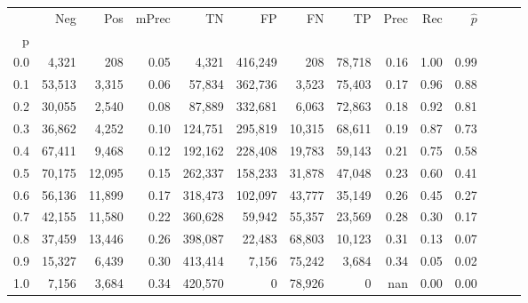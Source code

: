 \begin{tabular}{rrrrrrrrrrrrrr}
\toprule
{} &     Neg &     Pos & mPrec &       TN &       FP &      FN &      TP &  Prec &   Rec & $\hat{p}$ \\
p   &         &         &       &          &          &         &         &       &       &           \\
\midrule
0.0 &   4,321 &     208 &  0.05 &    4,321 &  416,249 &     208 &  78,718 &  0.16 &  1.00 &      0.99 \\
0.1 &  53,513 &   3,315 &  0.06 &   57,834 &  362,736 &   3,523 &  75,403 &  0.17 &  0.96 &      0.88 \\
0.2 &  30,055 &   2,540 &  0.08 &   87,889 &  332,681 &   6,063 &  72,863 &  0.18 &  0.92 &      0.81 \\
0.3 &  36,862 &   4,252 &  0.10 &  124,751 &  295,819 &  10,315 &  68,611 &  0.19 &  0.87 &      0.73 \\
0.4 &  67,411 &   9,468 &  0.12 &  192,162 &  228,408 &  19,783 &  59,143 &  0.21 &  0.75 &      0.58 \\
0.5 &  70,175 &  12,095 &  0.15 &  262,337 &  158,233 &  31,878 &  47,048 &  0.23 &  0.60 &      0.41 \\
0.6 &  56,136 &  11,899 &  0.17 &  318,473 &  102,097 &  43,777 &  35,149 &  0.26 &  0.45 &      0.27 \\
0.7 &  42,155 &  11,580 &  0.22 &  360,628 &   59,942 &  55,357 &  23,569 &  0.28 &  0.30 &      0.17 \\
0.8 &  37,459 &  13,446 &  0.26 &  398,087 &   22,483 &  68,803 &  10,123 &  0.31 &  0.13 &      0.07 \\
0.9 &  15,327 &   6,439 &  0.30 &  413,414 &    7,156 &  75,242 &   3,684 &  0.34 &  0.05 &      0.02 \\
1.0 &   7,156 &   3,684 &  0.34 &  420,570 &        0 &  78,926 &       0 &   nan &  0.00 &      0.00 \\
\bottomrule
\end{tabular}
